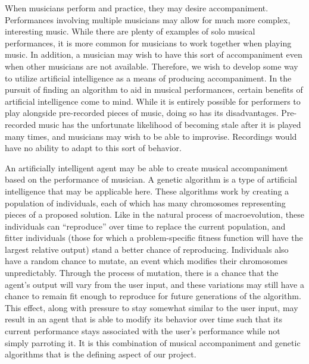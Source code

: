 \documentclass[conference]{IEEEtran}
\begin{document}
When musicians perform and practice, they may desire accompaniment. Performances involving multiple musicians may allow for much more complex, interesting music. While there are plenty of examples of solo musical performances, it is more common for musicians to work together when playing music. In addition, a musician may wish to have this sort of accompaniment even when other musicians are not available. Therefore, we wish to develop some way to utilize artificial intelligence as a means of producing accompaniment.  In the pursuit of finding an algorithm to aid in musical performances, certain benefits of artificial intelligence come to mind. While it is entirely possible for performers to play alongside pre-recorded pieces of music, doing so has its disadvantages. Pre-recorded music has the unfortunate likelihood of becoming stale after it is played many times, and musicians may wish to be able to improvise. Recordings would have no ability to adapt to this sort of behavior. 

An artificially intelligent agent may be able to create musical accompaniment based on the performance of musician.  A genetic algorithm is a type of artificial intelligence that may be applicable here. These algorithms work by creating a population of individuals, each of which has many chromosomes representing pieces of a proposed solution. Like in the natural process of macroevolution, these individuals can “reproduce” over time to replace the current population, and fitter individuals (those for which a problem-specific fitness function will have the largest relative output) stand a better chance of reproducing.  Individuals also have a random chance to mutate, an event which modifies their chromosomes unpredictably. Through the process of mutation, there is a chance that the agent’s output will vary from the user input, and these variations may still have a chance to remain fit enough to reproduce for future generations of the algorithm. This effect, along with pressure to stay somewhat similar to the user input, may result in an agent that is able to modify its behavior over time such that its current performance stays associated with the user’s performance while not simply parroting it.  It is this combination of musical accompaniment and genetic algorithms that is the defining aspect of our project. 
\end{document}
